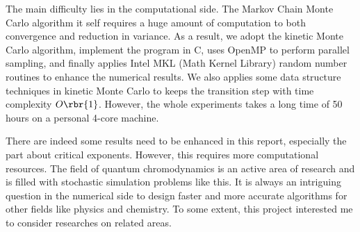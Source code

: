 \documentclass[english, nochinese]{pnote}
\begin{document}
The main difficulty lies in the computational side. The Markov Chain Monte Carlo algorithm it self requires a huge amount of computation to both convergence and reduction in variance. As a result, we adopt the kinetic Monte Carlo algorithm, implement the program in C, uses OpenMP to perform parallel sampling, and finally applies Intel MKL (Math Kernel Library) random number routines to enhance the numerical results. We also applies some data structure techniques in kinetic Monte Carlo to keeps the transition step with time complexity $ O \rbr{1} $. However, the whole experiments takes a long time of 50 hours on a personal 4-core machine.

There are indeed some results need to be enhanced in this report, especially the part about critical exponents. However, this requires more computational resources. The field of quantum chromodynamics is an active area of research and is filled with stochastic simulation problems like this. It is always an intriguing question in the numerical side to design faster and more accurate algorithms for other fields like physics and chemistry. To some extent, this project interested me to consider researches on related areas.
\end{document}
